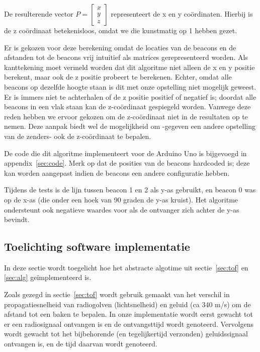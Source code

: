 \documentclass[a4paper,10pt]{article}
\begin{document}
De resulterende vector $P=\begin{bmatrix}x\\y\\z\end{bmatrix}$ representeert de x en y co\"ordinaten. Hierbij is de z co\"ordinaat betekenisloos, omdat we die kunstmatig op 1 hebben gezet.

Er is gekozen voor deze berekening omdat de locaties van de beacons en de afstanden tot de beacons vrij intuitief als matrices gerepresenteerd worden. Als kanttekening moet vermeld worden dat dit algoritme niet alleen de x en y positie berekent, maar ook de z positie probeert te berekenen. Echter, omdat alle beacons op dezelfde hoogte staan is dit met onze opstelling niet mogelijk geweest. Er is immers niet te achterhalen of de z positie positief of negatief is; doordat alle beacons in een vlak staan kan de z-co\"ordinaat gespiegeld worden. Vanwege deze reden hebben we ervoor gekozen om de z-co\"ordinaat niet in de resultaten op te nemen. Deze aanpak biedt wel de mogelijkheid om -gegeven een andere opstelling van de zenders- ook de z-co\"ordinaat te bepalen.

De code die dit algoritme implementeert voor de Arduino Uno is bijgevoegd in appendix~\ref{sec:code}. Merk op dat de posities van de beacons hardcoded is; deze kan worden aangepast indien de beacons een andere configuratie hebben.

Tijdens de tests is de lijn tussen beacon 1 en 2 als y-as gebruikt, en beacon 0 was op de x-as (die onder een hoek van 90 graden de y-as kruist). Het algoritme ondersteunt ook negatieve waardes voor als de ontvanger zich achter de y-as bevindt.

\subsection{Toelichting software implementatie}
In deze sectie wordt toegelicht hoe het abstracte algotime uit sectie~\ref{sec:tof} en \ref{sec:alg} ge\"implementeerd is.

Zoals gezegd in sectie~\ref{sec:tof} wordt gebruik gemaakt van het verschil in propagatiesnelheid van radiogolven (lichtsnelheid) en geluid (ca 340 m/s) om de afstand tot een baken te bepalen. In onze implementatie wordt eerst gewacht tot er een radiosignaal ontvangen is en de ontvangsttijd wordt genoteerd. Vervolgens wordt gewacht tot het bijbehorende (en tegelijkertijd verzonden) geluidssignaal ontvangen is, en de tijd daarvan wordt genoteerd.
\end{document}

